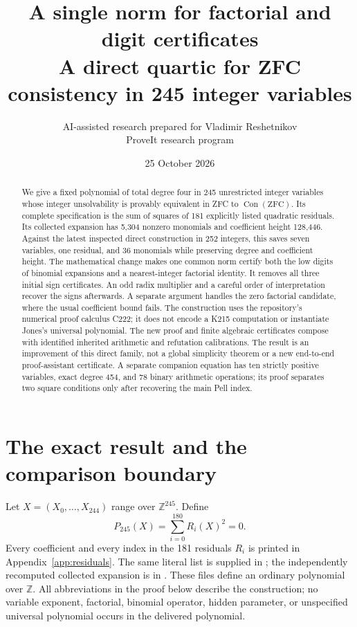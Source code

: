 \documentclass[11pt,letterpaper]{article}
\title{A single norm for factorial and digit certificates\\[5pt]
\large A direct quartic for ZFC consistency in 245 integer variables}
\author{AI-assisted research prepared for Vladimir Reshetnikov\\
\small ProveIt research program}
\date{25 October 2026}
\theoremstyle{remark}\newtheorem{remark}[theorem]{Remark}
\newcommand{\Z}{\mathbb Z}\newcommand{\N}{\mathbb N}
\newcommand{\Con}{\operatorname{Con}}
\newcommand{\Pnew}{P_{245}}
\begin{document}
\maketitle
\begin{abstract}
We give a fixed polynomial of total degree four in 245 unrestricted integer
variables whose integer unsolvability is provably equivalent in ZFC to
\(\Con(\mathrm{ZFC})\). Its complete specification is the sum of squares of
181 explicitly listed quadratic residuals. Its collected expansion has
5,304 nonzero monomials and coefficient height 128,446. Against the latest
inspected direct construction in 252 integers, this saves seven variables,
one residual, and 36 monomials while preserving degree and coefficient height.
The mathematical change makes one common norm certify both the low digits
of binomial expansions and a nearest-integer factorial identity. It removes
all three initial sign certificates. An odd radix multiplier and a careful
order of interpretation recover the signs afterwards. A separate argument
handles the zero factorial candidate, where the usual coefficient bound
fails. The construction uses the repository's numerical proof calculus
C222; it does not encode a K215 computation or instantiate Jones's universal
polynomial. The new proof and finite algebraic certificates compose with
identified inherited arithmetic and refutation calibrations. The result is
an improvement of this direct family, not a global simplicity theorem or a
new end-to-end proof-assistant certificate. A separate companion equation
has ten strictly positive variables, exact degree 454, and 78 binary
arithmetic operations; its proof separates two square conditions only after
recovering the main Pell index.
\end{abstract}
\clearpage
\tableofcontents
\clearpage

\section{The exact result and the comparison boundary}

Let \(X=(X_0,\ldots,X_{244})\) range over \(\Z^{245}\). Define
\begin{equation}\label{eq:main}
 \boxed{\quad \Pnew(X)=\sum_{i=0}^{180}R_i(X)^2=0.\quad}
\end{equation}
Every coefficient and every index in the 181 residuals \(R_i\) is printed in
Appendix~\ref{app:residuals}. The same literal list is supplied in
; the independently recomputed collected
expansion is in . These files
define an ordinary polynomial over \(\Z\). All abbreviations in the proof
below describe the construction; no variable exponent, factorial, binomial
operator, hidden parameter, or unspecified universal polynomial occurs in
the delivered polynomial.
\end{document}
